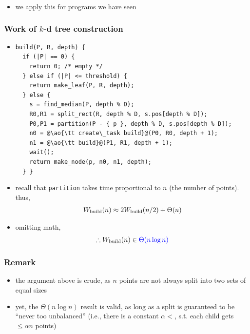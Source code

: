 \documentclass[12pt,dvipdfmx]{beamer}
\newcommand{\ao}[1]{{\color{blue}#1}}
\begin{document}
\begin{frame}[fragile]
\begin{itemize}
\item we apply this for programs we have seen
\end{itemize}
\end{frame}


\begin{frame}[fragile]
\frametitle{Work of $k$-d tree construction}
\begin{itemize}
\item []
\begin{lstlisting}
build(P, R, depth) {
  if (|P| == 0) {
    return 0; /* empty */
  } else if (|P| <= threshold) {
    return make_leaf(P, R, depth);
  } else {
    s = find_median(P, depth % D);
    R0,R1 = split_rect(R, depth % D, s.pos[depth % D]);
    P0,P1 = partition(P - { p }, depth % D, s.pos[depth % D]);
    n0 = @\ao{\tt create\_task build}@(P0, R0, depth + 1);
    n1 = @\ao{\tt build}@(P1, R1, depth + 1);
    wait();
    return make_node(p, n0, n1, depth);
  } }
\end{lstlisting}

\item []
  recall that {\tt partition}
  takes time proportional to $n$ (the number of points). thus, 
\[
\begin{array}{l}
W_{\mbox{\scriptsize build}}(n)
\approx 2W_{\mbox{\scriptsize build}}(n/2) + \Theta(n) \\
\end{array}
\]

\item [] omitting math,
\[ \therefore W_{\mbox{\scriptsize build}}(n) \in \ao{\Theta(n \log n)} \]
\end{itemize}
\end{frame}

\begin{frame}
\frametitle{Remark}
\begin{itemize}
\item the argument above is crude, as $n$
  points are not always split into two sets of
  equal sizes

\item yet, the $\Theta(n \log n)$ result is valid, as
  long as a split is guaranteed to be ``never too
  unbalanced'' (i.e., there is a constant $\alpha
  < $, s.t. each child gets $\leq \alpha n$
  points)
\end{itemize}
\end{frame}
\end{document}
